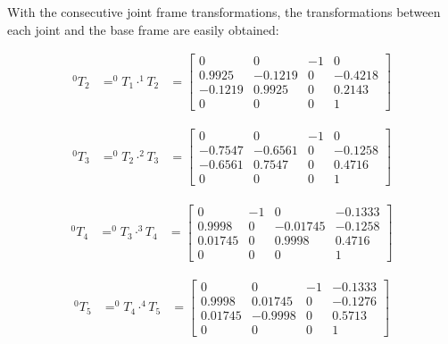 \documentclass[fleqn]{article}
\begin{document}
With the consecutive joint frame transformations, the transformations between each joint and the base frame are easily obtained:

\begin{equation}
\begin{split}
^{0}T_{2}&=^{0}T_{1}\cdot^{1}T_{2}
&=\begin{bmatrix}
0 & 0 & -1 & 0\\
0.9925 & -0.1219 & 0 & -0.4218\\
-0.1219 & 0.9925 & 0 & 0.2143\\
0 & 0 & 0 & 1
\end{bmatrix}
\end{split}
\end{equation}

\begin{equation}
\begin{split}
^{0}T_{3}&=^{0}T_{2}\cdot^{2}T_{3}
&=\begin{bmatrix}
0 & 0 & -1 & 0\\
-0.7547 & -0.6561 & 0 & -0.1258\\
-0.6561 & 0.7547 & 0 & 0.4716\\
0 & 0 & 0 & 1
\end{bmatrix}
\end{split}
\end{equation}

\begin{equation}
\begin{split}
^{0}T_{4}&=^{0}T_{3}\cdot^{3}T_{4}
&=\begin{bmatrix}
0 & -1 & 0 & -0.1333\\
0.9998 & 0 & -0.01745 & -0.1258\\
0.01745 & 0 & 0.9998 & 0.4716\\
0 & 0 & 0 & 1
\end{bmatrix}
\end{split}
\end{equation}

\begin{equation}
\begin{split}
^{0}T_{5}&=^{0}T_{4}\cdot^{4}T_{5}
&=\begin{bmatrix}
0 & 0 & -1 & -0.1333\\
0.9998 & 0.01745 & 0 & -0.1276\\
0.01745 & -0.9998 & 0 & 0.5713\\
0 & 0 & 0 & 1
\end{bmatrix}
\end{split}
\end{equation}
\end{document}
